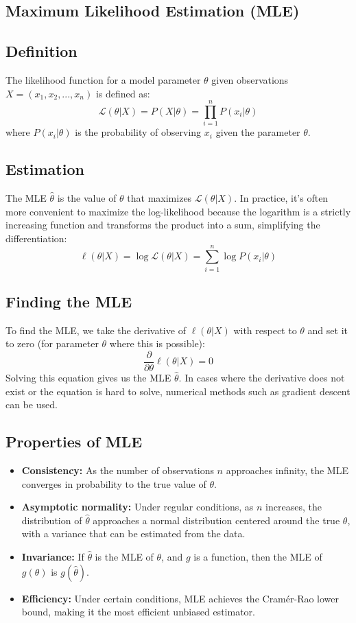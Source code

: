 \documentclass[8pt, a4paper, landscape, includeheadfoot]{extarticle}
\begin{document}
\begin{multicols*}{4}
	\section{Maximum Likelihood Estimation (MLE)}

	\subsection{Definition}
	The likelihood function for a model parameter \(\theta\) given observations \(X = (x_1, x_2, ..., x_n)\) is defined as:
	\[
		\mathcal{L}(\theta | X) = P(X | \theta) = \prod_{i=1}^{n} P(x_i | \theta)
	\]
	where \(P(x_i | \theta)\) is the probability of observing \(x_i\) given the parameter \(\theta\).

	\subsection{Estimation}
	The MLE \(\hat{\theta}\) is the value of \(\theta\) that maximizes \(\mathcal{L}(\theta | X)\). In practice, it's often more convenient to maximize the log-likelihood because the logarithm is a strictly increasing function and transforms the product into a sum, simplifying the differentiation:
	\[
		\ell(\theta | X) = \log \mathcal{L}(\theta | X) = \sum_{i=1}^{n} \log P(x_i | \theta)
	\]

	\subsection{Finding the MLE}
	To find the MLE, we take the derivative of \(\ell(\theta | X)\) with respect to \(\theta\) and set it to zero (for parameter \(\theta\) where this is possible):
	\[
		\frac{\partial}{\partial \theta} \ell(\theta | X) = 0
	\]
	Solving this equation gives us the MLE \(\hat{\theta}\). In cases where the derivative does not exist or the equation is hard to solve, numerical methods such as gradient descent can be used.

	\subsection{Properties of MLE}
	\begin{itemize}[itemsep=0pt]
		\item \textbf{Consistency:} As the number of observations \(n\) approaches infinity, the MLE converges in probability to the true value of \(\theta\).
		\item \textbf{Asymptotic normality:} Under regular conditions, as \(n\) increases, the distribution of \(\hat{\theta}\) approaches a normal distribution centered around the true \(\theta\), with a variance that can be estimated from the data.
		\item \textbf{Invariance:} If \(\hat{\theta}\) is the MLE of \(\theta\), and \(g\) is a function, then the MLE of \(g(\theta)\) is \(g(\hat{\theta})\).
		\item \textbf{Efficiency:} Under certain conditions, MLE achieves the Cramér-Rao lower bound, making it the most efficient unbiased estimator.
	\end{itemize}


\end{multicols*}
\end{document}
